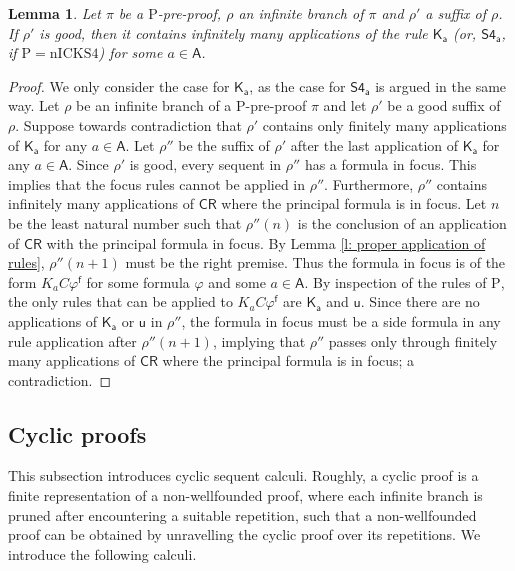 \documentclass{myifcolog}
\newcommand\C {C}
\newcommand{\K}{K}
\newcommand\A{\mathsf{A}}
\newcommand{\agi}{a}
\newcommand{\f}{\mathsf{f}}
\newcommand{\hickp}{\mathrm{P}}
\newcommand{\nicks}{\mathrm{nICKS4}}
\newtheorem{lemma}[theorem]{Lemma}
\numberwithin{theorem}{section}
\begin{document}
\begin{lemma}\label{lemma good suffix contains inf many box appl}
    Let $\pi$ be a $\hickp$-pre-proof, $\rho$ an infinite branch of $\pi$ and $\rho'$ a suffix of $\rho$. If $\rho'$ is good, then it contains infinitely many applications of the rule $\mathsf{\K_\agi}$ (or, $\mathsf{S4_\agi}$, if $\hickp = \nicks$) for some $\agi \in \A$.
\end{lemma}
\begin{proof}
    We only consider the case for $\mathsf{K_\agi}$, as the case for $\mathsf{S4_\agi}$ is argued in the same way. Let $\rho$ be an infinite branch of a $\hickp$-pre-proof $\pi$ and let $\rho'$ be a good suffix of $\rho$. Suppose towards contradiction that $\rho'$ contains only finitely many applications of $\mathsf{\K_\agi}$ for any $\agi \in \A$. Let $\rho''$ be the suffix of $\rho'$ after the last application of $\mathsf{\K_\agi}$ for any $\agi \in \A$. Since $\rho'$ is good, every sequent in $\rho''$ has a formula in focus. This implies that the focus rules cannot be applied in $\rho''$. Furthermore, $\rho''$ contains infinitely many applications of $\mathsf{\C R}$ where the principal formula is in focus. Let $n$ be the least natural number such that $\rho''(n)$ is the conclusion of an application of $\mathsf{\C R}$ with the principal formula in focus. By Lemma \ref{l: proper application of rules}, $\rho''(n+1)$ must be the right premise. Thus the formula in focus is of the form $\K_\agi \C \varphi^\f$ for some formula $\varphi$ and some $\agi \in \A$. By inspection of the rules of $\hickp$, the only rules that can be applied to $\K_\agi \C \varphi^\f$ are $\mathsf{\K_\agi}$ and $\mathsf{u}$. Since there are no applications of $\mathsf{\K_\agi}$ or $\mathsf{u}$ in $\rho''$, the formula in focus must be a side formula in any rule application after $\rho''(n+1)$, implying that $\rho''$ passes only through finitely many applications of $\mathsf{\C R}$ where the principal formula is in focus; a contradiction.
\end{proof}
%
\subsection{Cyclic proofs}

This subsection introduces cyclic sequent calculi. Roughly, a cyclic proof is a finite representation of a non-wellfounded proof, where each infinite branch is pruned after encountering a suitable repetition, such that a non-wellfounded proof can be obtained by unravelling the cyclic proof over its repetitions. We introduce the following calculi.
\end{document}
